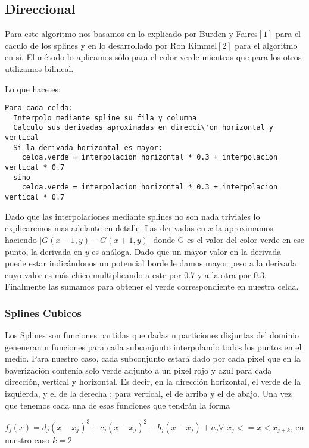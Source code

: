 \subsection{Direccional}

Para este algoritmo nos basamos en lo explicado por Burden y Faires$[1]$ para el caculo de los splines y en lo desarrollado por Ron Kimmel$[2]$ para el algoritmo en sí. El método lo aplicamos sólo para el color verde mientras que para los otros utilizamos bilineal. 



Lo que hace es:
\begin{verbatim}
Para cada celda:
  Interpolo mediante spline su fila y columna
  Calculo sus derivadas aproximadas en direcci\'on horizontal y vertical
  Si la derivada horizontal es mayor:
    celda.verde = interpolacion horizontal * 0.3 + interpolacion vertical * 0.7
  sino
    celda.verde = interpolacion horizontal * 0.3 + interpolacion vertical * 0.7
\end{verbatim}

Dado que las interpolaciones mediante splines no son nada triviales lo explicaremos mas adelante en detalle. Las derivadas en $x$  la aproximamos haciendo $|G(x-1,y)-G(x+1,y)|$ donde G es el valor del color verde en ese punto, la derivada en $y$ es análoga. Dado que un mayor valor en la derivada puede estar indicándonos un potencial borde le damos mayor peso a la derivada cuyo valor es más chico multiplicando a este por 0.7 y a la otra por 0.3. Finalmente las sumamos para obtener el verde correspondiente en nuestra celda.

\subsubsection{Splines Cubicos}
Los Splines son funciones partidas que dadas n particiones disjuntas del dominio geneneran n funciones para cada subconjunto interpolando todos los puntos en el medio. Para nuestro caso, cada subconjunto estará dado por cada pixel que en la bayerización contenía solo verde adjunto a un pixel rojo y azul para cada dirección, vertical y horizontal. Es decir, en la dirección horizontal, el verde de la izquierda, y el de la derecha ; para vertical, el de arriba y el de abajo. 
Una vez que tenemos cada una de esas funciones que tendrán la forma

$f_j(x) = d_j(x-x_j)^3 + c_j(x-x_j)^2 + b_j(x-x_j) + a_j \forall$ $x_j <= x < x_{j+k}$, en nuestro caso $k = 2$ \\

